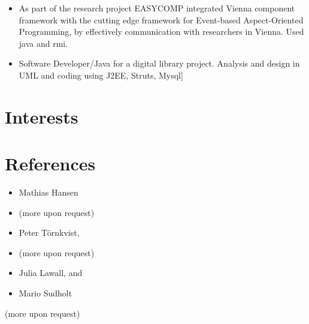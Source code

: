 \documentclass[11pt,a4paper,sans]{moderncv}        %
\begin{document}
\begin{itemize}
 \item As part of the research project EASYCOMP integrated Vienna component framework with the cutting edge framework for Event-based Aspect-Oriented Programming, by effectively communication with researchers in Vienna. Used java and rmi. 

 \item Software Developer/Java for a digital library project. Analysis and design in UML and coding using J2EE, Struts, Mysql] 
\end{itemize}

\section{Interests}

\section{References}
\begin{cvcolumns}
      {\begin{itemize}
      \item Mathias Hansen 
      \item(more upon request)
      \end{itemize}}
    {\begin{itemize}
        \item Peter Törnkvist, 
        \item(more upon request)
        \end{itemize}}
    
    {\begin{itemize}
            \item Julia Lawall, and
            \item   Mario Sudholt
    \end{itemize}(more upon request)}
\end{cvcolumns}
\footnotesize
\end{document}
